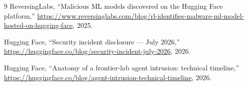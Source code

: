 \documentclass[11pt]{article}
\begin{document}
\begin{thebibliography}{9}
ReversingLabs,
``Malicious ML models discovered on the Hugging Face platform,''
\url{https://www.reversinglabs.com/blog/rl-identifies-malware-ml-model-hosted-on-hugging-face}, 2025.

Hugging Face,
``Security incident disclosure --- July 2026,''
\url{https://huggingface.co/blog/security-incident-july-2026}, 2026.

Hugging Face,
``Anatomy of a frontier-lab agent intrusion: technical timeline,''
\url{https://huggingface.co/blog/agent-intrusion-technical-timeline}, 2026.

\end{thebibliography}
\end{document}
